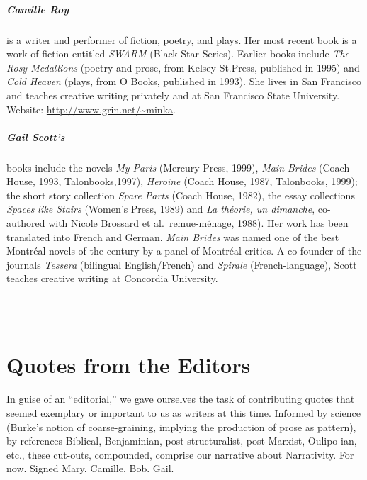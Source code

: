 \documentclass[
]{memoir}
\begin{document}
\hypertarget{camille-roy-1}{%
\paragraph{Camille Roy}\label{camille-roy-1}}

is a writer and performer of fiction, poetry, and plays. Her most recent
book is a work of fiction entitled \emph{SWARM} (Black Star Series).
Earlier books include \emph{The Rosy Medallions} (poetry and prose, from
Kelsey St.Press, published in 1995) and \emph{Cold Heaven} (plays, from
O Books, published in 1993). She lives in San Francisco and teaches
creative writing privately and at San Francisco State University.
Website:
\href{http://www.grin.net/\%7Eminka}{http://www.grin.net/\textasciitilde{}minka}.

\hypertarget{gail-scotts-1}{%
\paragraph{Gail Scott's}\label{gail-scotts-1}}

books include the novels \emph{My Paris} (Mercury Press, 1999),
\emph{Main Brides} (Coach House, 1993, Talonbooks,1997), \emph{Heroine}
(Coach House, 1987, Talonbooks, 1999); the short story collection
\emph{Spare Parts} (Coach House, 1982), the essay collections
\emph{Spaces like Stairs} (Women's Press, 1989) and \emph{La théorie, un
dimanche}, co-authored with Nicole Brossard et al.~remue-ménage, 1988).
Her work has been translated into French and German. \emph{Main Brides}
was named one of the best Montréal novels of the century by a panel of
Montréal critics. A co-founder of the journals \emph{Tessera} (bilingual
English/French) and \emph{Spirale} (French-language), Scott teaches
creative writing at Concordia University.\\

~

~

\hypertarget{quotes-from-the-editors}{%
\chapter{Quotes from the Editors}\label{quotes-from-the-editors}}

In guise of an ``editorial,'' we gave ourselves the task of contributing
quotes that seemed exemplary or important to us as writers at this time.
Informed by science (Burke's notion of coarse-graining, implying the
production of prose as pattern), by references Biblical, Benjaminian,
post structuralist, post-Marxist, Oulipo-ian, etc., these cut-outs,
compounded, comprise our narrative about Narrativity. For now. Signed
Mary. Camille. Bob. Gail. ~
\end{document}
